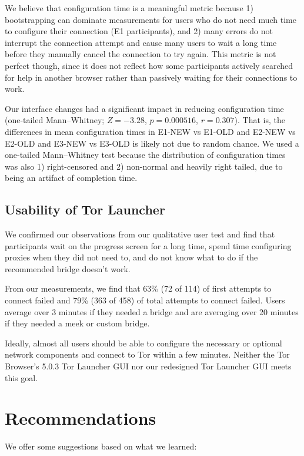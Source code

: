 \documentclass[USenglish,oneside,twocolumn]{article}
\begin{document}
We believe that configuration time is a meaningful metric because 1) bootstrapping can dominate measurements for users who do not need much time to configure their connection (E1 participants), and 2) many errors do not interrupt the connection attempt and cause many users to wait a long time before they manually cancel the connection to try again. This metric is not perfect though, since it does not reflect how some participants actively searched for help in another browser rather than passively waiting for their connections to work. 

Our interface changes had a significant impact in reducing configuration time (one-tailed Mann--Whitney; $Z = -3.28$, $p = 0.000516$, $r = 0.307$). That is, the differences in mean configuration times in E1-NEW vs E1-OLD and E2-NEW vs E2-OLD and E3-NEW vs E3-OLD is likely not due to random chance. We used a one-tailed Mann--Whitney test because the distribution of configuration times was also 1) right-censored and 2) non-normal and heavily right tailed, due to being an artifact of completion time. 

\subsection{Usability of Tor Launcher} 
We confirmed our observations from our qualitative user test and find that participants wait on the progress screen for a long time, spend time configuring proxies when they did not need to, and do not know what to do if the recommended bridge doesn't work. 

From our measurements, we find that 63\% (72 of 114) of first attempts to connect failed and 79\% (363 of 458) of total attempts to connect failed. Users average over 3 minutes if they needed a bridge and are averaging over 20 minutes if they needed a meek or custom bridge. 

Ideally, almost all users should be able to configure the necessary or optional network components and connect to Tor within a few minutes. Neither the Tor Browser's 5.0.3 Tor Launcher GUI nor our redesigned Tor Launcher GUI meets this goal. 

\section{Recommendations}
\label{sec:recommendations}
We offer some suggestions based on what we learned: \\
\end{document}
